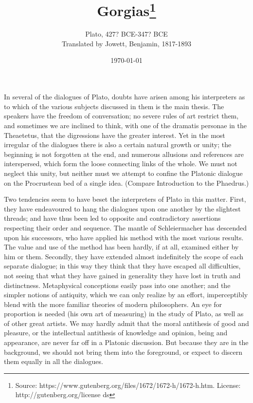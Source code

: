 \documentclass[11pt,letter]{article}
\begin{document}
\title{Gorgias\thanks{Source: https://www.gutenberg.org/files/1672/1672-h/1672-h.htm. License: http://gutenberg.org/license ds}}
\date{\today}
\author{Plato, 427? BCE-347? BCE\\ Translated by Jowett, Benjamin, 1817-1893}
\maketitle

\setcounter{tocdepth}{1}
\tableofcontents
\renewcommand{\baselinestretch}{1.0}
\normalsize
\newpage


\par  In several of the dialogues of Plato, doubts have arisen among his interpreters as to which of the various subjects discussed in them is the main thesis. The speakers have the freedom of conversation; no severe rules of art restrict them, and sometimes we are inclined to think, with one of the dramatis personae in the Theaetetus, that the digressions have the greater interest. Yet in the most irregular of the dialogues there is also a certain natural growth or unity; the beginning is not forgotten at the end, and numerous allusions and references are interspersed, which form the loose connecting links of the whole. We must not neglect this unity, but neither must we attempt to confine the Platonic dialogue on the Procrustean bed of a single idea. (Compare Introduction to the Phaedrus.)

\par  Two tendencies seem to have beset the interpreters of Plato in this matter. First, they have endeavoured to hang the dialogues upon one another by the slightest threads; and have thus been led to opposite and contradictory assertions respecting their order and sequence. The mantle of Schleiermacher has descended upon his successors, who have applied his method with the most various results. The value and use of the method has been hardly, if at all, examined either by him or them. Secondly, they have extended almost indefinitely the scope of each separate dialogue; in this way they think that they have escaped all difficulties, not seeing that what they have gained in generality they have lost in truth and distinctness. Metaphysical conceptions easily pass into one another; and the simpler notions of antiquity, which we can only realize by an effort, imperceptibly blend with the more familiar theories of modern philosophers. An eye for proportion is needed (his own art of measuring) in the study of Plato, as well as of other great artists. We may hardly admit that the moral antithesis of good and pleasure, or the intellectual antithesis of knowledge and opinion, being and appearance, are never far off in a Platonic discussion. But because they are in the background, we should not bring them into the foreground, or expect to discern them equally in all the dialogues.
\end{document}
